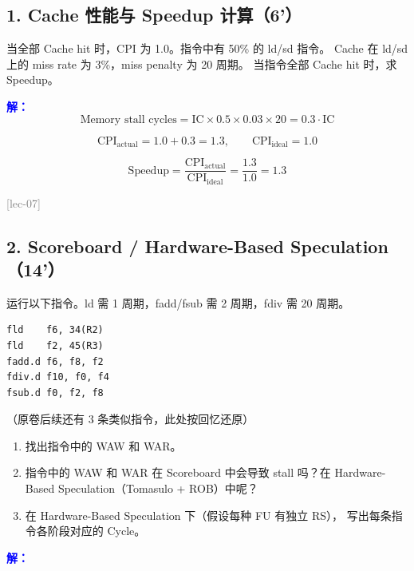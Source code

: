 \documentclass[11pt,a4paper]{article}
\newcommand{\ans}{\par\noindent\textcolor{blue}{\textbf{解：}}}
\newcommand{\lec}[1]{\textcolor{gray}{[lec-#1]}}
\begin{document}
\subsection*{1. Cache 性能与 Speedup 计算（6'）}

当全部 Cache hit 时，CPI 为 1.0。指令中有 50\% 的 ld/sd 指令。
Cache 在 ld/sd 上的 miss rate 为 3\%，miss penalty 为 20 周期。
当指令全部 Cache hit 时，求 Speedup。

\ans
\[
\text{Memory stall cycles} = \text{IC} \times 0.5 \times 0.03 \times 20
= 0.3 \cdot \text{IC}
\]

\[
\text{CPI}_\text{actual} = 1.0 + 0.3 = 1.3,\qquad
\text{CPI}_\text{ideal} = 1.0
\]

\[
\text{Speedup} = \frac{\text{CPI}_\text{actual}}{\text{CPI}_\text{ideal}}
= \frac{1.3}{1.0} = \mathbf{1.3}
\]

\lec{07}

\subsection*{2. Scoreboard / Hardware-Based Speculation（14'）}

运行以下指令。ld 需 1 周期，fadd/fsub 需 2 周期，fdiv 需 20 周期。

\begin{verbatim}
fld    f6, 34(R2)
fld    f2, 45(R3)
fadd.d f6, f8, f2
fdiv.d f10, f0, f4
fsub.d f0, f2, f8
\end{verbatim}

（原卷后续还有 3 条类似指令，此处按回忆还原）

\begin{enumerate}[label=(\arabic*),leftmargin=*]
  \item 找出指令中的 WAW 和 WAR。
  \item 指令中的 WAW 和 WAR 在 Scoreboard 中会导致 stall 吗？在
        Hardware-Based Speculation（Tomasulo + ROB）中呢？
  \item 在 Hardware-Based Speculation 下（假设每种 FU 有独立 RS），
        写出每条指令各阶段对应的 Cycle。
\end{enumerate}

\ans
\end{document}
